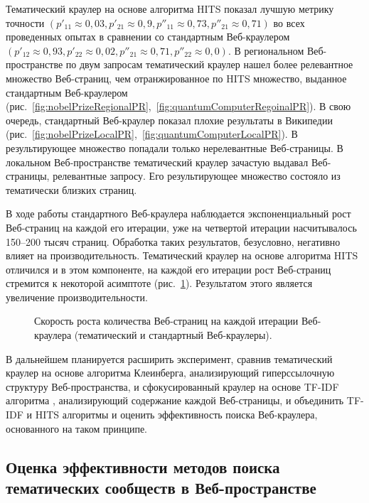 Тематический краулер на основе алгоритма HITS показал лучшую метрику точности \((p'_{11} \approx 0,03, p'_{21} \approx 0,9, p''_{11} \approx 0,73, p''_{21} \approx 0,71)\) во всех проведенных опытах в сравнении со стандартным Веб-краулером \((p'_{12} \approx 0,93, p'_{22} \approx 0,02, p''_{21} \approx 0,71, p''_{22} \approx 0,0)\). В региональном Веб-пространстве по двум запросам тематический краулер нашел более релевантное множество Веб-страниц, чем отранжированное по HITS множество, выданное стандартным Веб-краулером (рис.~\cref{fig:nobelPrizeRegionalPR},~\cref{fig:quantumComputerRegoinalPR}). В свою очередь, стандартный Веб-краулер показал плохие результаты в Википедии (рис.~\cref{fig:nobelPrizeLocalPR},~\cref{fig:quantumComputerLocalPR}). В результирующее множество попадали только нерелевантные Веб-страницы. В локальном Веб-пространстве тематический краулер зачастую выдавал Веб-страницы, релевантные запросу. Его результирующее множество состояло из тематически близких страниц.

В ходе работы стандартного Веб-краулера наблюдается экспоненциальный рост Веб-страниц на каждой его итерации, уже на четвертой итерации насчитывалось 150–200 тысяч страниц. Обработка таких результатов, безусловно, негативно влияет на производительность. Тематический краулер на основе алгоритма HITS отличился и в этом компоненте, на каждой его итерации рост Веб-страниц стремится к некоторой асимптоте (рис.~\cref{fig:crawlerIterationSpeed}). Результатом этого является увеличение производительности.

\begin{figure}[ht]
	\caption{Скорость роста количества Веб-страниц на каждой итерации Веб-краулера (тематический и стандартный Веб-краулеры).}\label{fig:crawlerIterationSpeed}
\end{figure}

В дальнейшем планируется расширить эксперимент, сравнив тематический краулер на основе алгоритма Клеинберга, анализирующий гиперссылочную структуру Веб-пространства, и сфокусированный краулер на основе TF-IDF алгоритма \cite{ManningRaghavanSchutze}, анализирующий содержание каждой Веб-страницы, и объединить TF-IDF и HITS алгоритмы и оценить эффективность поиска Веб-краулера, основанного на таком принципе.

\subsection{Оценка эффективности методов поиска тематических сообществ в Веб-пространстве}\label{subsec:ch1/sec3/sub6}

